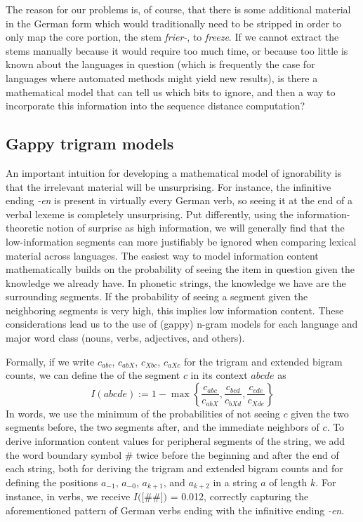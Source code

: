 The reason for our problems is, of course, that there is some additional material in the German form which would traditionally need to be stripped in order to only map the core portion, the stem \textit{frier-}, to \textit{freeze}. If we cannot extract the stems manually because it would require too much time, or because too little is known about the languages in question (which is frequently the case for languages where automated methods might yield new results), is there a mathematical model that can tell us which bits to ignore, and then a way to incorporate this information into the sequence distance computation?

\subsection{Gappy trigram models}\label{sec:4.3.2}
An important intuition for developing a mathematical model of ignorability is that the irrelevant material will be unsurprising. For instance, the infinitive ending \textit{-en} is present in virtually every German verb, so seeing it at the end of a verbal lexeme is completely unsurprising. Put differently, using the information-theoretic notion of surprise as high information, we will generally find that the low-information segments can more justifiably be ignored when comparing lexical material across languages. The easiest way to model information content mathematically builds on the probability of seeing the item in question given the knowledge we already have. In phonetic strings, the knowledge we have are the surrounding segments. If the probability of seeing a segment given the neighboring segments is very high, this implies low information content. These considerations lead us to the use of (gappy) n-gram models for each language and major word class (nouns, verbs, adjectives, and others).

Formally, if we write $c_{abc}$, $c_{abX}$, $c_{Xbc}$, $c_{aXc}$ for the trigram and extended bigram counts, we can define the \textit{} of the segment $c$ in its context $abcde$ as 
\begin{equation}
  I(abcde) := 1 - \max\left \{\frac{c_{abc}}{c_{abX}}, \frac{c_{bcd}}{c_{bXd}}, \frac{c_{cde}}{c_{Xde}} \right \}
\end{equation}
In words, we use the minimum of the probabilities of not seeing $c$ given the two segments before, the two segments after, and the immediate neighbors of $c$. To derive information content values for peripheral segments of the string, we add the word boundary symbol $\#$ twice before the beginning and after the end of each string, both for deriving the trigram and extended bigram counts and for defining the positions $a_{-1}$, $a_{-0}$, $a_{k+1}$, and $a_{k+2}$ in a string $a$ of length $k$. For instance, in  verbs, we receive $I($[\#\#]$)$ = 0.012, correctly capturing the aforementioned pattern of German verbs ending with the infinitive ending \textit{-en}.

